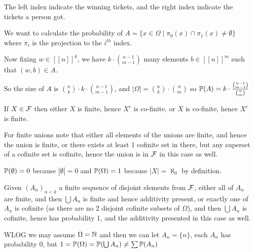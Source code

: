 \begin{cExercise}
\begin{cPart}
		The left index indicate the winning tickets, and the right index indicate the tickets a person got.
		
		We want to calculate the probability of $A=\{x\in\Omega\mid \pi_0(x)\cap\pi_1(x)\ne\emptyset\}$ where $\pi_i$ is the projection to the $i^{th}$ index.
		
		Now fixing $w\in[[n]]^k$, we have $k\cdot {n-1\choose m-1}$ many elements $b\in[[n]]^m$ such that $(w,b)\in A$.
		
		So the size of $A$ is ${n\choose k}\cdot k\cdot {n-1\choose m-1}$, and $|\Omega|={n\choose k}\cdot{n\choose m}$ so $\P(A)=k\cdot\frac{{n-1\choose m-1}}{{n\choose m}}$
	\end{cPart}
\end{cExercise}
\begin{cExercise}[Bonus]
	\begin{cPart}
		If $X\in\cal F$ then either $X$ is finite, hence $X^c$ is co-finite, or $X$ is co-finite, hence $X^c$ is finite.
		
		For finite unions note that either all elements of the unions are finite, and hence the union is finite, or there exists at least 1 cofinite set in there, but any superset of a cofinite set is cofinite, hence the union is in $\cal F$ in this case as well.
	\end{cPart}
	\begin{cPart}
		$\P(\emptyset)=0$ because $|\emptyset|=0$ and $\P(\Omega)=1$ because $|X|=\aleph_0$ by definition.
		
		Given $(A_n)_{n<k}$ a finite sequence of disjoint elements from $\cal F$, either all of $A_n$ are finite, and then $\bigcup A_n$ is finite and hence additivity present, or exactly one of $A_n$ is cofinite (as there are no 2 disjoint cofinite subsets of $\Omega$), and then $\bigcup A_n$ is cofinite, hence has probability 1, and the additivity presented in this case as well.
	\end{cPart}
	\begin{cPart}
		WLOG we may assume $\Omega=\N$ and then we can let $A_n=\{n\}$, each $A_n$ has probability $0$, but $1=\P(\Omega)=\P(\bigcup A_n)\ne \sum \P(A_n)$
	\end{cPart}
\end{cExercise}





